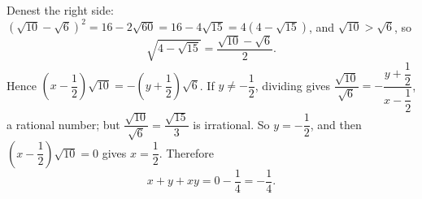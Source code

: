Denest the right side: $\left(\sqrt{10}-\sqrt6\right)^2=16-2\sqrt{60}=16-4\sqrt{15}=4\left(4-\sqrt{15}\right)$, and $\sqrt{10}>\sqrt6$, so
\[
\sqrt{4-\sqrt{15}}=\dfrac{\sqrt{10}-\sqrt6}{2}.
\]
Hence $\left(x-\dfrac{1}{2}\right)\sqrt{10}=-\left(y+\dfrac{1}{2}\right)\sqrt6$. If $y\ne-\dfrac{1}{2}$, dividing gives $\dfrac{\sqrt{10}}{\sqrt6}=-\dfrac{y+\dfrac{1}{2}}{x-\dfrac{1}{2}}$, a rational number; but $\dfrac{\sqrt{10}}{\sqrt6}=\dfrac{\sqrt{15}}{3}$ is irrational. So $y=-\dfrac{1}{2}$, and then $\left(x-\dfrac{1}{2}\right)\sqrt{10}=0$ gives $x=\dfrac{1}{2}$. Therefore
\[
x+y+xy=0-\dfrac{1}{4}=\boxed{-\dfrac{1}{4}}.
\]
